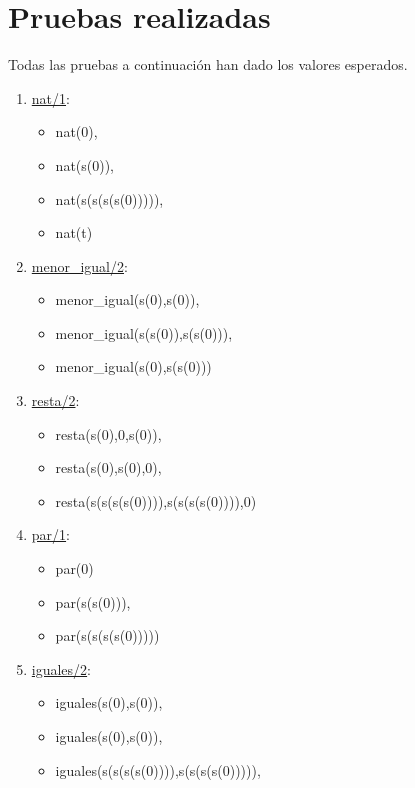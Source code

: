 \documentclass[12pt, a4paper, spanish]{article}
\begin{document}
\newpage

\section{Pruebas realizadas}

Todas las pruebas a continuación han dado los valores esperados.

\begin{enumerate}
	\item \underline{nat/1}:
	\begin{itemize}
	\item nat(0),            
	\item nat(s(0)),
	\item nat(s(s(s(s(0))))),
	\item nat(t)
	\end{itemize}
	
	\item \underline{menor\_igual/2}:
	\begin{itemize}
	\item menor\_igual(s(0),s(0)),             
	\item menor\_igual(s(s(0)),s(s(0))),
	\item menor\_igual(s(0),s(s(0)))
	\end{itemize}

\item \underline{resta/2}:
\begin{itemize}
	\item resta(s(0),0,s(0)),            
	\item resta(s(0),s(0),0),             
	\item resta(s(s(s(s(0)))),s(s(s(s(0)))),0)
\end{itemize}

\item \underline{par/1}:
\begin{itemize}
	\item par(0)             
	\item par(s(s(0))),             
	\item par(s(s(s(s(0)))))
\end{itemize}

\item \underline{iguales/2}:
\begin{itemize}
	\item iguales(s(0),s(0)),             
	\item iguales(s(0),s(0)),             
	\item iguales(s(s(s(s(0)))),s(s(s(s(0))))),
\end{itemize}


\end{enumerate}
\end{document}
